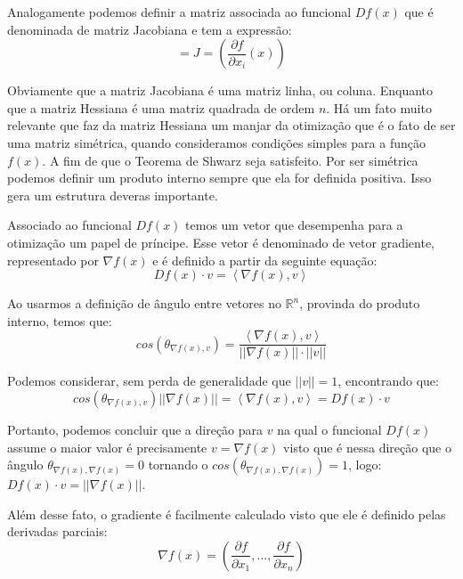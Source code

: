 \par Analogamente podemos definir a matriz associada ao funcional $Df(x)$ que é denominada de matriz Jacobiana e tem a expressão:
\begin{equation}
  [Df(x)] = J = \left(\frac{\partial f}{\partial x_i}(x)\right)
\end{equation}
\par Obviamente que a matriz Jacobiana é uma matriz linha, ou coluna. Enquanto que a matriz Hessiana é uma matriz quadrada de ordem $n$. Há um fato muito relevante que faz da matriz Hessiana um manjar da otimização que é o fato de ser uma matriz simétrica, quando consideramos condições simples para a função $f(x)$. A fim de que o Teorema de Shwarz seja satisfeito. Por ser simétrica podemos definir um produto interno sempre que ela for definida positiva. Isso gera um estrutura deveras importante. 
\par Associado ao funcional $Df(x)$ temos um vetor que desempenha para a otimização um papel de príncipe. Esse vetor é denominado de vetor gradiente, representado por $\nabla f(x)$ e é definido a partir da seguinte equação:
\begin{equation}
  Df(x) \cdot v = \left\langle \nabla f(x), v\right\rangle
\end{equation}
\par Ao usarmos a definição de ângulo entre vetores no $\mathbb{R}^n$, provinda do produto interno, temos que:
\begin{equation}
  cos(\theta_{\nabla f(x),v}) = \frac{\left\langle \nabla f(x), v\right\rangle}{||\nabla f(x)||\cdot ||v||}
\end{equation}
\par Podemos considerar, sem perda de generalidade que $||v||=1$, encontrando que:
\begin{equation}
  cos(\theta_{\nabla f(x),v})  ||\nabla f(x)|| = \left\langle \nabla f(x), v\right\rangle = Df(x) \cdot v
\end{equation}
\par Portanto, podemos concluir que a direção para $v$ na qual o funcional $Df(x)$ assume o maior valor é precisamente $v = \nabla f(x)$ visto que é nessa direção que o ângulo $\theta_{\nabla f(x),\nabla f(x)} = 0$ tornando o $cos(\theta_{\nabla f(x),\nabla f(x)}) =1$, logo: $Df(x) \cdot v = ||\nabla f(x)||$. 
\par Além desse fato, o gradiente é facilmente calculado visto que ele é definido pelas derivadas parciais:
\begin{equation}
  \nabla f(x) = \left(\frac{\partial f}{\partial x_1}, ..., \frac{\partial f}{\partial x_n}\right)
\end{equation}

